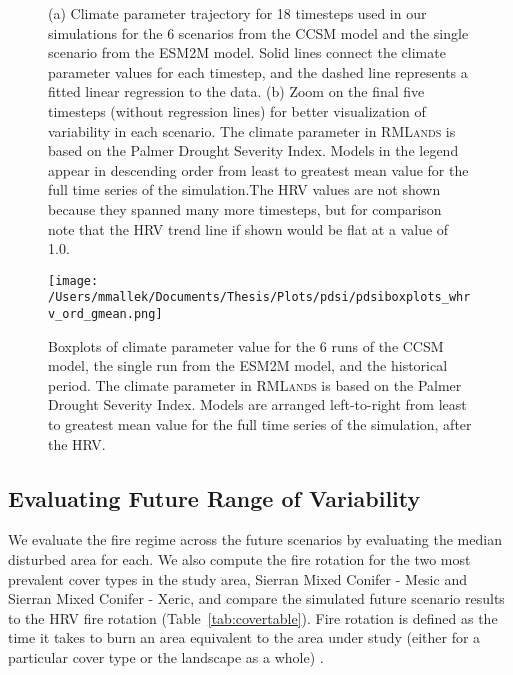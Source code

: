\documentclass[12pt]{article}
\begin{document}
\begin{spacing}{1}
\begin{figure}[!htbp]
\centering
	\caption{(a) Climate parameter trajectory for 18 timesteps used in our simulations for the 6 scenarios from the CCSM model and the single scenario from the ESM2M model. Solid lines connect the climate parameter values for each timestep, and the dashed line represents a fitted linear regression to the data. (b) Zoom on the final five timesteps (without regression lines) for better visualization of variability in each scenario. The climate parameter in \textsc{RMLands} is based on the Palmer Drought Severity Index. Models in the legend appear in descending order from least to greatest mean value for the full time series of the simulation.The HRV values are not shown because they spanned many more timesteps, but for comparison note that the HRV trend line if shown would be flat at a value of 1.0.}
\label{fig:pdsi_future}

\end{figure}



\begin{figure}[!htbp]
\centering
\texttt{[image: /Users/mmallek/Documents/Thesis/Plots/pdsi/pdsiboxplots\_whrv\_ord\_gmean.png]}
\caption{Boxplots of climate parameter value for the 6 runs of the CCSM model, the single run from the ESM2M model, and the historical period.  The climate parameter in \textsc{RMLands} is based on the Palmer Drought Severity Index. Models are arranged left-to-right from least to greatest mean value for the full time series of the simulation, after the HRV.}
\label{pdsi-boxplots}
\end{figure}


\subsection*{Evaluating Future Range of Variability}
We evaluate the fire regime across the future scenarios by evaluating the median disturbed area for each. We also compute the fire rotation for the two most prevalent cover types in the study area, Sierran Mixed Conifer - Mesic and Sierran Mixed Conifer - Xeric,  and compare the simulated future scenario results to the HRV fire rotation (Table~\ref{tab:covertable}). Fire rotation is defined as the time it takes to burn an area equivalent to the area under study (either for a particular cover type or the landscape as a whole) \citep{Agee1993}.%
%



\end{spacing}
\end{document}
